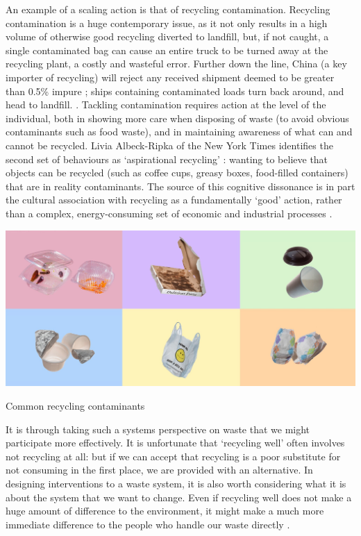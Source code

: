 \documentclass[nofonts,nols,justified,nobib]{tufte-book}
\begin{document}
An example of a scaling action is that of recycling contamination. Recycling contamination is a huge contemporary issue, as it not only results in a high volume of otherwise good recycling diverted to landfill, but, if not caught, a single contaminated bag can cause an entire truck to be turned away at the recycling plant, a costly and wasteful error. Further down the line, China (a key importer of recycling) will reject any received shipment deemed to be greater than 0.5\% impure \cite{casella_recycle_2018}; ships containing contaminated loads turn back around, and head to landfill. \cite{albeck-ripka_your_2018}. Tackling contamination requires action at the level of the individual, both in showing more care when disposing of waste (to avoid obvious contaminants such as food waste), and in maintaining awareness of what can and cannot be recycled. Livia Albeck-Ripka of the New York Times identifies the second set of behaviours as `aspirational recycling' \cite{albeck-ripka_6_2018}: wanting to believe that objects can be recycled (such as coffee cups, greasy boxes, food-filled containers) that are in reality contaminants. The source of this cognitive dissonance is in part the cultural association with recycling as a fundamentally `good' action, rather than a complex, energy-consuming set of economic and industrial processes \cite{tierney_reign_2018}.

\begin{marginfigure}
\includegraphics[width=\textwidth]{img/1/contaminants.jpg}
\caption{Common recycling contaminants \cite{albeck-ripka_6_2018}}
\end{marginfigure}

It is through taking such a systems perspective on waste that we might participate more effectively. It is unfortunate that `recycling well' often involves not recycling at all: but if we can accept that recycling is a poor substitute for not consuming in the first place, we are provided with an alternative. In designing interventions to a waste system, it is also worth considering what it is about the system that we want to change. Even if recycling well does not make a huge amount of difference to the environment, it might make a much more immediate difference to the people who handle our waste directly \cite{liboiron_against_2014}.
\end{document}
